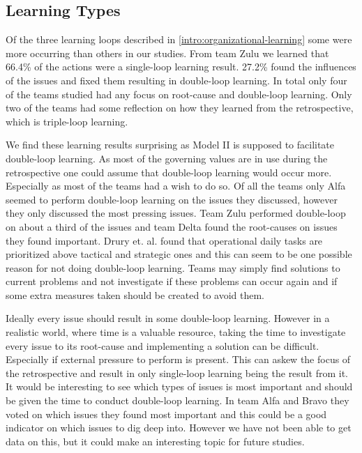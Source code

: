 \subsection{Learning Types}
\label{discussion:learning-types}
Of the three learning loops described in \autoref{intro:organizational-learning} some were more occurring than others in our studies. From team Zulu we learned that 66.4\% of the actions were a single-loop learning result. 27.2\% found the influences of the issues and fixed them resulting in double-loop learning. In total only four of the teams studied had any focus on root-cause and double-loop learning. Only two of the teams had some reflection on how they learned from the retrospective, which is triple-loop learning.

We find these learning results surprising as Model II is supposed to facilitate double-loop learning. As most of the governing values are in use during the retrospective one could assume that double-loop learning would occur more. Especially as most of the teams had a wish to do so. Of all the teams only Alfa seemed to perform double-loop learning on the issues they discussed, however they only discussed the most pressing issues. Team Zulu performed double-loop on about a third of the issues and team Delta found the root-causes on issues they found important. Drury et. al. \cite{Drury2012} found that operational daily tasks are prioritized above tactical and strategic ones and this can seem to be one possible reason for not doing double-loop learning. Teams may simply find solutions to current problems and not investigate if these problems can occur again and if some extra measures taken should be created to avoid them. 

Ideally every issue should result in some double-loop learning. However in a realistic world, where time is a valuable resource, taking the time to investigate every issue to its root-cause and implementing a solution can be difficult. Especially if external pressure to perform is present. This can askew the focus of the retrospective and result in only single-loop learning being the result from it. It would be interesting to see which types of issues is most important and should be given the time to conduct double-loop learning. In team Alfa and Bravo they voted on which issues they found most important and this could be a good indicator on which issues to dig deep into. However we have not been able to get data on this, but it could make an interesting topic for future studies.

